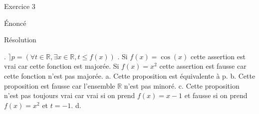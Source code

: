 \hypertarget{Exercice_3}{
\Huge{\begin{center}Exercice 3\end{center} \leavevmode\newline }}

\hypertarget{enonce}{%
\LARGE{Énoncé}\label{enonce}}
\newline
\newline


\hypertarget{resolution}{%
\LARGE{Résolution}\label{resolution}}
\newline
{}. $\rceil p = (\forall t\in \mathbb{R}, \exists x \in \mathbb{R}, t \leq f(x))$
\newline
{}. Si $f(x) = \cos (x)$ cette assertion est vrai car cette fonction est majorée.
\newline
Si $f(x) = x^2$ cette assertion est fausse car cette fonction n'est pas majorée.
\newline
{}
\newline
\newline
a. Cette proposition est équivalente à p.
\newline
\newline
b. Cette proposition est fausse car l'ensemble $\mathbb{R}$ n'est pas minoré.
\newline
\newline
c. Cette proposition n'est pas toujours vrai car vrai si on prend $f(x) = x-1$ et fausse si on prend $f(x) = x^2$ et $t=-1$.
\newline
\newline
d.
